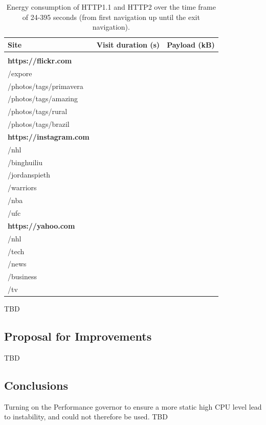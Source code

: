 \documentclass{article}
\begin{document}
\begin{table}[h!]

    \begin{tabular}{lll}
        \textbf{Site} & \textbf{Visit duration (s)} & \textbf{Payload (kB)} \\
        \hline \vspace{-3mm}\\
        \textbf{https://flickr.com} \\
        \hspace{1em} /expore \\
        \hspace{1em} /photos/tags/primavera \\
        \hspace{1em} /photos/tags/amazing \\
        \hspace{1em} /photos/tags/rural \\
        \hspace{1em} /photos/tags/brazil \vspace{1mm}\\
        \textbf{https://instagram.com} \\
        \hspace{1em} /nhl \\
        \hspace{1em} /binghuiliu \\
        \hspace{1em} /jordanspieth \\
        \hspace{1em} /warriors \\
        \hspace{1em} /nba \\
        \hspace{1em} /ufc \vspace{1mm}\\
        \textbf{https://yahoo.com} \\
        \hspace{1em} /nhl \\
        \hspace{1em} /tech \\
        \hspace{1em} /news \\
        \hspace{1em} /business \\
        \hspace{1em} /tv \vspace{1mm}\\
    \end{tabular}
    \caption{Energy consumption of HTTP1.1 and HTTP2 over the time frame of 24-395 seconds (from first navigation up until the exit navigation).}
    \label{table:url_manifest}
\end{table}
TBD

\subsection{Proposal for Improvements}
TBD

\subsection{Conclusions}
Turning on the Performance governor to ensure a more static high CPU level lead to instability, and could not therefore be used.
TBD



\end{document}
